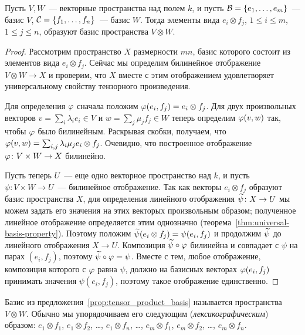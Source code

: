 \begin{proposition}\label{prop:tensor_product_basis}
Пусть $V,W$~--- векторные пространства над полем $k$, и пусть
$\mathcal B=\{e_1,\dots,e_m\}$~--- базис $V$,
$\mathcal C=\{f_1,\dots,f_n\}$~--- базис $W$.
Тогда элементы вида $e_i\otimes f_j$, $1\leq i\leq m$, $1\leq j\leq
n$, образуют базис пространства $V\otimes W$.
\end{proposition}
\begin{proof}
Рассмотрим пространство $X$ размерности $mn$, базис которого состоит
из элементов вида $e_i\otimes f_j$. Сейчас мы определим билинейное
отображение $V\otimes W\to X$ и проверим, что $X$ вместе с этим
отображением удовлетворяет универсальному свойству тензорного
произведения.

Для определения $\varphi$ сначала положим $\varphi(e_i,f_j) = e_i\otimes f_j$.
Для двух произвольных векторов $v = \sum_i\lambda_i e_i\in V$
и $w = \sum_j\mu_j f_j\in W$ теперь определим $\varphi(v,w)$ так,
чтобы $\varphi$ было билинейным. Раскрывая скобки, получаем, что
$\varphi(v,w) = \sum_{i,j}\lambda_i\mu_j e_i\otimes f_j$.
Очевидно, что построенное отображение $\varphi\colon V\times W\to X$
билинейно.

Пусть теперь $U$~--- еще одно векторное пространство над $k$, и пусть
$\psi\colon V\times W\to U$~--- билинейное отображение. Так как
векторы $e_i\otimes f_j$ образуют базис пространства $X$, для
определения линейного отображения $\widetilde\psi\colon X\to U$ мы можем
задать его значения на этих векторых произвольным образом; полученное
линейное отображение определяется этим однозначно
(теорема~\ref{thm:universal-basis-property}).
Поэтому положим $\widetilde\psi(e_i\otimes f_j) = \psi(e_i,f_j)$ и продолжим
$\widetilde\psi$ до линейного отображения $X\to U$. Композиция
$\widetilde\psi\circ\varphi$ билинейна и совпадает с $\psi$ на парах $(e_i,f_j)$,
поэтому $\widetilde\psi\circ\varphi = \psi$. Вместе с тем, любое отображение,
композиция которого с $\varphi$ равна $\psi$, должно на базисных векторах
$\varphi(e_i,f_j)$ принимать значения $\psi(e_i,f_j)$, поэтому такое
отображение единственно.
\end{proof}

\begin{definition}\label{dfn:tensor_basis}
Базис из предложения~\ref{prop:tensor_product_basis} называется
 пространства $V\otimes
W$. Обычно мы
упорядочиваем его следующим ({\em лексикографическим}) образом:
$e_1\otimes f_1$, $e_1\otimes f_2$, \dots, $e_1\otimes f_n$, \dots,
$e_m\otimes f_1$, $e_m\otimes f_2$, \dots, $e_m\otimes f_n$.
\end{definition}

